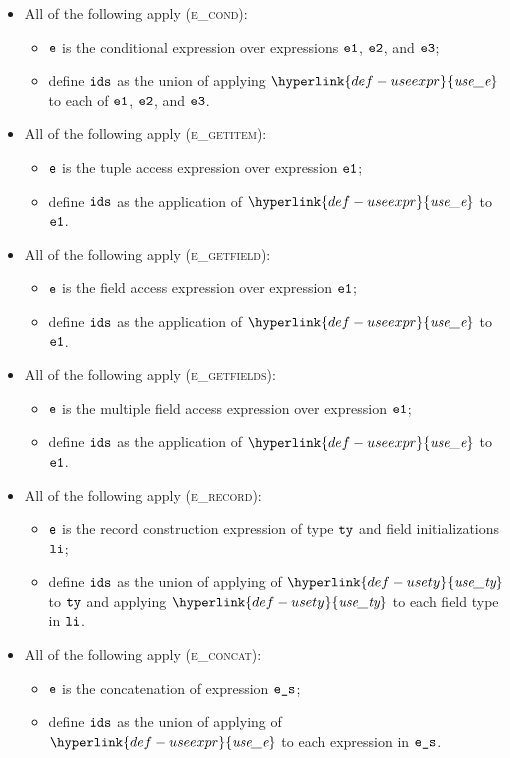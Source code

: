 \documentclass{book}
\newcommand\usety[0]{\hyperlink{def-usety}{\textfunc{use\_ty}}}
\newcommand\useexpr[0]{\hyperlink{def-useexpr}{\textfunc{use\_e}}}
\begin{document}
\begin{itemize}
  \item All of the following apply (\textsc{e\_cond}):
  \begin{itemize}
    \item $\texttt{e}$ is the conditional expression over expressions $\texttt{e1}$, $\texttt{e2}$, and $\texttt{e3}$;
    \item define $\texttt{ids}$ as the union of applying $\useexpr$ to each of $\texttt{e1}$, $\texttt{e2}$, and $\texttt{e3}$.
  \end{itemize}

  \item All of the following apply (\textsc{e\_getitem}):
  \begin{itemize}
    \item $\texttt{e}$ is the tuple access expression over expression $\texttt{e1}$;
    \item define $\texttt{ids}$ as the application of $\useexpr$ to $\texttt{e1}$.
  \end{itemize}

  \item All of the following apply (\textsc{e\_getfield}):
  \begin{itemize}
    \item $\texttt{e}$ is the field access expression over expression $\texttt{e1}$;
    \item define $\texttt{ids}$ as the application of $\useexpr$ to $\texttt{e1}$.
  \end{itemize}

  \item All of the following apply (\textsc{e\_getfields}):
  \begin{itemize}
    \item $\texttt{e}$ is the multiple field access expression over expression $\texttt{e1}$;
    \item define $\texttt{ids}$ as the application of $\useexpr$ to $\texttt{e1}$.
  \end{itemize}

  \item All of the following apply (\textsc{e\_record}):
  \begin{itemize}
    \item $\texttt{e}$ is the record construction expression of type $\texttt{ty}$ and field initializations $\texttt{li}$;
    \item define $\texttt{ids}$ as the union of applying of $\usety$ to $\texttt{ty}$ and applying $\usety$ to each field type in $\texttt{li}$.
  \end{itemize}

  \item All of the following apply (\textsc{e\_concat}):
  \begin{itemize}
    \item $\texttt{e}$ is the concatenation of expression $\texttt{e\_s}$;
    \item define $\texttt{ids}$ as the union of applying of $\useexpr$ to each expression in $\texttt{e\_s}$.
  \end{itemize}


\end{itemize}
\end{document}

